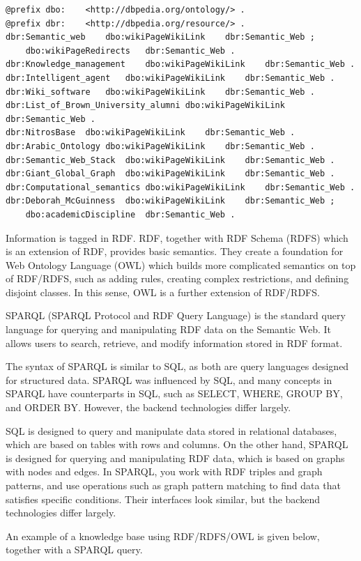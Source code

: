 \begin{lstlisting}
@prefix dbo:	<http://dbpedia.org/ontology/> .
@prefix dbr:	<http://dbpedia.org/resource/> .
dbr:Semantic_web	dbo:wikiPageWikiLink	dbr:Semantic_Web ;
	dbo:wikiPageRedirects	dbr:Semantic_Web .
dbr:Knowledge_management	dbo:wikiPageWikiLink	dbr:Semantic_Web .
dbr:Intelligent_agent	dbo:wikiPageWikiLink	dbr:Semantic_Web .
dbr:Wiki_software	dbo:wikiPageWikiLink	dbr:Semantic_Web .
dbr:List_of_Brown_University_alumni	dbo:wikiPageWikiLink	dbr:Semantic_Web .
dbr:NitrosBase	dbo:wikiPageWikiLink	dbr:Semantic_Web .
dbr:Arabic_Ontology	dbo:wikiPageWikiLink	dbr:Semantic_Web .
dbr:Semantic_Web_Stack	dbo:wikiPageWikiLink	dbr:Semantic_Web .
dbr:Giant_Global_Graph	dbo:wikiPageWikiLink	dbr:Semantic_Web .
dbr:Computational_semantics	dbo:wikiPageWikiLink	dbr:Semantic_Web .
dbr:Deborah_McGuinness	dbo:wikiPageWikiLink	dbr:Semantic_Web ;
	dbo:academicDiscipline	dbr:Semantic_Web .
\end{lstlisting}

Information is tagged in RDF. RDF, together with RDF Schema (RDFS) which is an extension of RDF, provides basic semantics. They create a foundation for Web Ontology Language (OWL) which builds more complicated semantics on top of RDF/RDFS, such as adding rules, creating complex restrictions, and defining disjoint classes. In this sense, OWL is a further extension of RDF/RDFS.

SPARQL (SPARQL Protocol and RDF Query Language) is the standard query language for querying and manipulating RDF data on the Semantic Web. It allows users to search, retrieve, and modify information stored in RDF format.

The syntax of SPARQL is similar to SQL, as both are query languages designed for structured data. SPARQL was influenced by SQL, and many concepts in SPARQL have counterparts in SQL, such as SELECT, WHERE, GROUP BY, and ORDER BY. However, the backend technologies differ largely.

SQL is designed to query and manipulate data stored in relational databases, which are based on tables with rows and columns. On the other hand, SPARQL is designed for querying and manipulating RDF data, which is based on graphs with nodes and edges. In SPARQL, you work with RDF triples and graph patterns, and use operations such as graph pattern matching to find data that satisfies specific conditions. Their interfaces look similar, but the backend technologies differ largely.

An example of a knowledge base using RDF/RDFS/OWL is given below, together with a SPARQL query.

